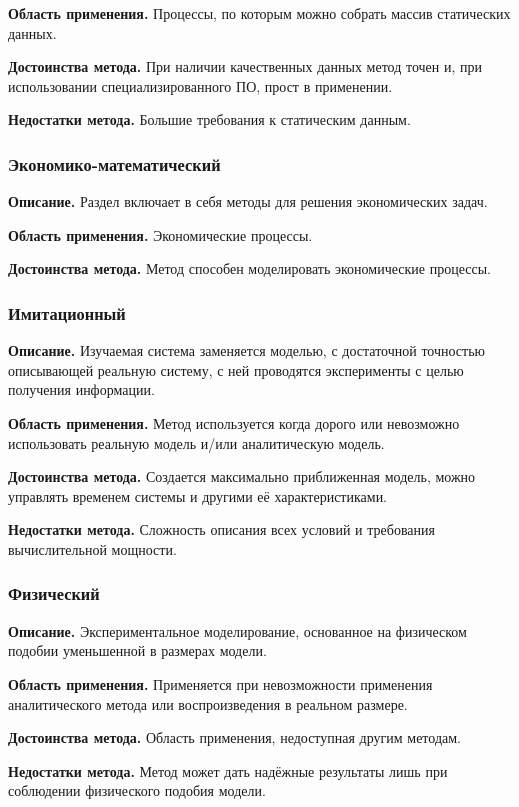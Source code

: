 \textbf{Область применения.} Процессы, по которым можно собрать массив статических данных.

\textbf{Достоинства метода.} При наличии качественных данных метод точен и, при использовании специализированного ПО, прост в применении.

\textbf{Недостатки метода.} Большие требования к статическим данным.
\subsubsection*{Экономико-математический}
\textbf{Описание.} Раздел включает в себя методы для решения экономических задач.

\textbf{Область применения.} Экономические процессы.

\textbf{Достоинства метода.} Метод способен моделировать экономические процессы.

\subsubsection*{Имитационный}
\textbf{Описание.} Изучаемая система заменяется моделью, с достаточной точностью описывающей реальную систему, с ней проводятся эксперименты с целью получения информации.

\textbf{Область применения.} Метод используется когда дорого или невозможно использовать реальную модель и/или аналитическую модель.

\textbf{Достоинства метода.} Создается максимально приближенная модель, можно управлять временем системы и другими её характеристиками.

\textbf{Недостатки метода.} Сложность описания всех условий и требования вычислительной мощности.

\subsubsection*{Физический}
\textbf{Описание.} Экспериментальное моделирование, основанное на физическом подобии уменьшенной в размерах модели.

\textbf{Область применения.} Применяется при невозможности применения аналитического метода или воспроизведения в реальном размере.

\textbf{Достоинства метода.} Область применения, недоступная другим методам.

\textbf{Недостатки метода.} Метод может дать надёжные результаты лишь при соблюдении физического подобия модели.

